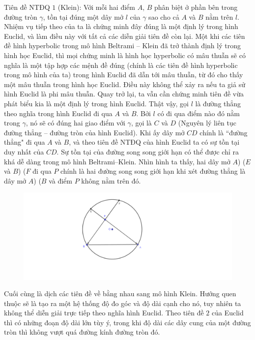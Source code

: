 \begin{multicols}{2}
	\vskip 0.1cm
	Tiên đề NTĐQ $1$ (Klein): Với mỗi hai điểm $A$, $B$ phân biệt ở phần bên trong đường tròn $\gamma$, tồn tại đúng một dây mở $l$ của $\gamma$ sao cho cả $A$ và $B$ nằm trên $l$.
	\vskip 0.1cm
	Nhiệm vụ tiếp theo của ta là chứng minh đây đúng là một định lý trong hình Euclid, và làm điều này với tất cả các diễn giải tiên đề còn lại. Một khi các tiên đề hình hyperbolic trong mô hình Beltrami -- Klein đã trở thành định lý trong hình học Euclid, thì mọi chứng minh là hình học hyperbolic có mâu thuẫn sẽ có nghĩa là một tập hợp các mệnh đề đúng (chính là các tiên đề hình hyperbolic trong mô hình của ta) trong hình Euclid đã dẫn tới mâu thuẫn, từ đó cho thấy một mâu thuẫn trong hình học Euclid. Điều này không thể xảy ra nếu ta giả sử hình Euclid là phi mâu thuẫn.
	Quay trở lại, ta vẫn cần chứng minh tiên đề vừa phát biểu kia là một định lý trong hình Euclid.
	Thật vậy, gọi $l$ là đường thẳng theo nghĩa trong hình Euclid đi qua $A$ và $B$. Bởi $l$ có đi qua điểm nào đó nằm trong $\gamma$, nó sẽ có đúng hai giao điểm với $\gamma$, gọi là $C$ và $D$ (Nguyên lý liên tục đường thẳng -- đường tròn của hình Euclid). Khi ấy dây mở $CD$ chính là ``đường thẳng" đi qua $A$ và $B$, và theo tiên đề NTĐQ của hình Euclid ta có sự tồn tại duy nhất của $CD$.
	\vskip 0.1cm
	Sự tồn tại của  đường song song giới hạn có thể được chỉ ra khá dễ dàng trong mô hình Beltrami--Klein. Nhìn hình ta thấy, hai dây mở $A$) ($E$ và $B$) ($F$ đi qua $P$ chính là hai đường song song giới hạn khi xét đường thẳng là dây mở $A$) ($B$ và điểm $P$ không nằm trên đó.
	\begin{figure}[H]
		\vspace*{-5pt}
		\centering
		\captionsetup{labelformat= empty, justification=centering}
		\includegraphics[width= 1\linewidth]{Đường song song giới hạn Klein.pdf}
		\vspace*{-10pt}
	\end{figure}
	Cuối cùng là dịch các tiên đề về bằng nhau sang mô hình Klein. Hướng quen thuộc sẽ là tạo ra một hệ thống độ đo góc và độ dài cạnh cho nó, tuy nhiên ta không thể diễn giải trực tiếp theo nghĩa hình Euclid. Theo tiên đề $2$ của Euclid thì có những đoạn độ dài lớn tùy ý, trong khi độ dài các dây cung của một đường tròn thì không vượt quá đường kính đường tròn đó.

\end{multicols}
